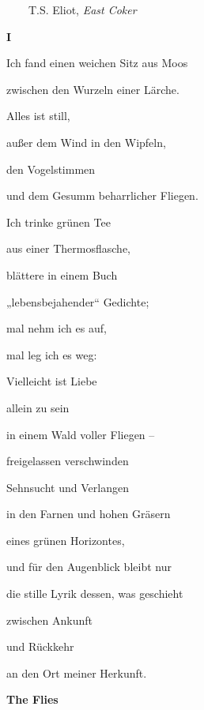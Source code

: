 \documentclass[a4paper]{article}
\begin{document}
\bigskip

\ \ \ \ T.S. Eliot, \textit{East Coker}

\clearpage
\bigskip

{\bfseries
I}



\bigskip


\bigskip

Ich fand einen weichen Sitz aus Moos

zwischen den Wurzeln einer Lärche.


\bigskip

Alles ist still, 

außer dem Wind in den Wipfeln,

den Vogelstimmen

und dem Gesumm beharrlicher Fliegen.


\bigskip

Ich trinke grünen Tee 

aus einer Thermosflasche,

blättere in einem Buch

„lebensbejahender“ Gedichte;


\bigskip

mal nehm ich es auf,

mal leg ich es weg:


\bigskip

Vielleicht ist Liebe

allein zu sein

in einem Wald voller Fliegen – 


\bigskip

freigelassen verschwinden

Sehnsucht und Verlangen

in den Farnen und hohen Gräsern

eines grünen Horizontes,


\bigskip

und für den Augenblick bleibt nur

die stille Lyrik dessen, was geschieht

zwischen Ankunft 

und Rückkehr

an den Ort meiner Herkunft.


\bigskip

\clearpage
\bigskip

{\bfseries
The Flies}


\bigskip


\bigskip
\end{document}
